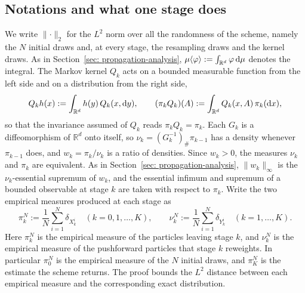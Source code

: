 \documentclass{article}
\begin{document}
\subsection{Notations and what one stage does}
\label{subsec: appendix-notation}

We write $\lVert\cdot\rVert_2$ for the $L^2$ norm over all the randomness of the scheme, namely the $N$ initial draws and, at every stage, the resampling draws and the kernel draws. As in Section~\ref{sec: propagation-analysis}, $\mu\langle \varphi\rangle:=\int_{\mathbb R^d}\varphi\,\mathrm{d}\mu$ denotes the integral. The Markov kernel $Q_k$ acts on a bounded measurable function from the left side and on a distribution from the right side,
\begin{equation}
    Q_kh(x) := \int_{\mathbb R^d} h(y)\,Q_k(x,\mathrm{d} y) ,
    \qquad
    (\pi_kQ_k)(A) := \int_{\mathbb R^d} Q_k(x,A)\,\pi_k(\mathrm{d} x) ,
    \label{eq: appendix-kernel}
\end{equation}
so that the invariance assumed of $Q_k$ reads $\pi_kQ_k=\pi_k$. Each $G_k$ is a diffeomorphism of $\mathbb R^d$ onto itself, so $\nu_k=(G_k^{-1})_{\#}\pi_{k-1}$ has a density whenever $\pi_{k-1}$ does, and $w_k=\pi_k/\nu_k$ is a ratio of densities. Since $w_k>0$, the measures $\nu_k$ and $\pi_k$ are equivalent. As in Section~\ref{sec: propagation-analysis}, $\lVert w_k\rVert_\infty$ is the $\nu_k$-essential supremum of $w_k$, and the essential infimum and supremum of a bounded observable at stage $k$ are taken with respect to $\pi_k$. Write the two empirical measures produced at each stage as
\begin{equation}
    \pi_k^N := \frac1N\sum_{i=1}^{N}\delta_{X_k^i}
    \quad (k=0,1,\dots,K),
    \qquad
    \nu_k^N := \frac1N\sum_{i=1}^{N}\delta_{Y_k^i}
    \quad (k=1,\dots,K) .
    \label{eq: appendix-empirical}
\end{equation}
Here $\pi_k^N$ is the empirical measure of the particles leaving stage $k$, and $\nu_k^N$ is the empirical measure of the pushforward particles that stage $k$ reweights. In particular $\pi_0^N$ is the empirical measure of the $N$ initial draws, and $\pi_K^N$ is the estimate the scheme returns. The proof bounds the $L^2$ distance between each empirical measure and the corresponding exact distribution.
\end{document}
